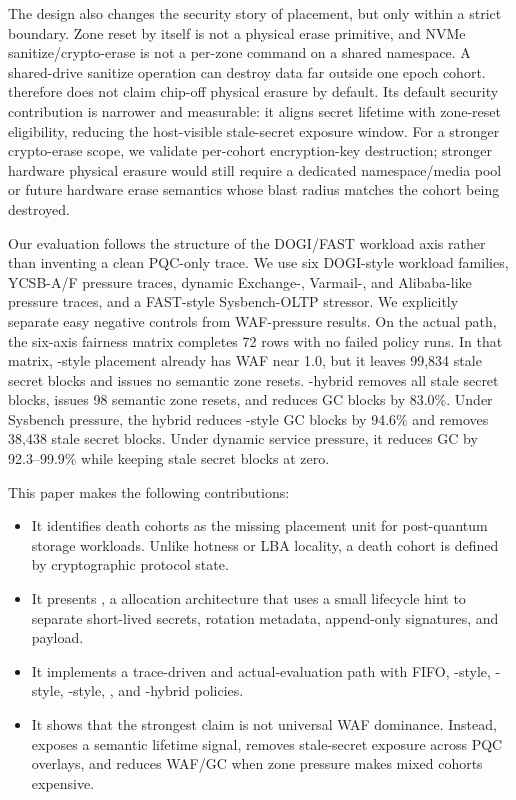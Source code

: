 The design also changes the security story of \zns placement, but only within a strict boundary.  Zone reset by itself is not a physical erase primitive, and NVMe sanitize/crypto-erase is not a per-zone command on a shared namespace.  A shared-drive sanitize operation can destroy data far outside one epoch cohort.  \system therefore does not claim chip-off physical erasure by default.  Its default security contribution is narrower and measurable: it aligns secret lifetime with zone-reset eligibility, reducing the host-visible stale-secret exposure window.  For a stronger crypto-erase scope, we validate per-cohort encryption-key destruction; stronger hardware physical erasure would still require a dedicated namespace/media pool or future hardware erase semantics whose blast radius matches the cohort being destroyed.

Our evaluation follows the structure of the DOGI/FAST workload axis rather than inventing a clean PQC-only trace.  We use six DOGI-style workload families, YCSB-A/F pressure traces, dynamic Exchange-, Varmail-, and Alibaba-like pressure traces, and a FAST-style Sysbench-OLTP stressor.  We explicitly separate easy negative controls from WAF-pressure results.  On the actual \zns path, the six-axis fairness matrix completes 72 rows with no failed policy runs.  In that matrix, \dogi-style placement already has WAF near 1.0, but it leaves 99,834 stale secret blocks and issues no semantic zone resets.  \system-\dogi hybrid removes all stale secret blocks, issues 98 semantic zone resets, and reduces GC blocks by 83.0\%.  Under Sysbench pressure, the hybrid reduces \dogi-style GC blocks by 94.6\% and removes 38,438 stale secret blocks.  Under dynamic service pressure, it reduces GC by 92.3--99.9\% while keeping stale secret blocks at zero.

This paper makes the following contributions:

\begin{itemize}[leftmargin=*]
\item It identifies death cohorts as the missing placement unit for post-quantum storage workloads.  Unlike hotness or LBA locality, a death cohort is defined by cryptographic protocol state.
\item It presents \system, a \zns allocation architecture that uses a small lifecycle hint to separate short-lived secrets, rotation metadata, append-only signatures, and payload.
\item It implements a trace-driven and actual-\zns evaluation path with FIFO, \sepbit-style, \midas-style, \dogi-style, \system, and \system-\dogi hybrid policies.
\item It shows that the strongest claim is not universal WAF dominance.  Instead, \system exposes a semantic lifetime signal, removes stale-secret exposure across PQC overlays, and reduces WAF/GC when zone pressure makes mixed cohorts expensive.
\end{itemize}
